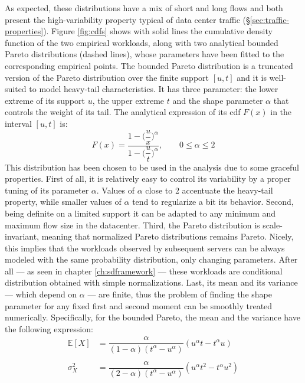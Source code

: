 As expected, these distributions have a mix of short and long flows and both present the high-variability property typical of data center traffic (\S \ref{sec:traffic-properties}). Figure \ref{fig:cdfs} shows with solid lines the cumulative density function of the two empirical workloads, along with two analytical bounded Pareto distributions (dashed lines), whose parameters have been fitted to the corresponding empirical points. The bounded Pareto distribution is a truncated version of the Pareto distribution over the finite support $[u,t]$ and it is well-suited to model heavy-tail characteristics. It has three parameter: the lower extreme of its support $u$, the upper extreme $t$ and the shape parameter $\alpha$ that controls the weight of its tail. The analytical expression of its cdf $F(x)$ in the interval $[u,t]$ is:
\begin{equation}
	F(x) = \dfrac{1-\Big(\dfrac{u}{x}\Big)^{\alpha}}{1-\Big(\dfrac{u}{t}\Big)^{\alpha}}, \qquad 0 \le \alpha \le 2
\end{equation}
This distribution has been chosen to be used in the analysis due to some graceful properties. First of all, it is relatively easy to control its variability by a proper tuning of its parameter $\alpha$. Values of $\alpha$ close to 2 accentuate the heavy-tail property, while smaller values of $\alpha$ tend to regularize a bit its behavior. Second, being definite on a limited support it can be adapted to any minimum and maximum flow size in the datacenter. Third, the Pareto distribution is scale-invariant, meaning that normalized Pareto distributions remains Pareto. Nicely, this implies that the workloads observed by subsequent servers can be always modeled with the same probability distribution, only changing parameters. After all --- as seen in chapter \ref{ch:sdframework} --- these workloads  are conditional distribution obtained with simple normalizations. Last, its mean and its variance  --- which depend on $\alpha$ --- are finite, thus the problem of finding the shape parameter for any fixed first and second moment can be smoothly treated numerically. Specifically, for the bounded Pareto, the mean and the variance have the following expression:
\begin{align*}
\mathbb{E}[X] &= \dfrac{\alpha}{(1-\alpha)(t^{\alpha}-u^{\alpha})} (u^{\alpha}t - t^{\alpha}u) \\ \\
\sigma_X^2 &= \dfrac{\alpha}{(2-\alpha)(t^{\alpha}-u^{\alpha})} (u^{\alpha}t^2 - t^{\alpha}u^2)
\end{align*}
